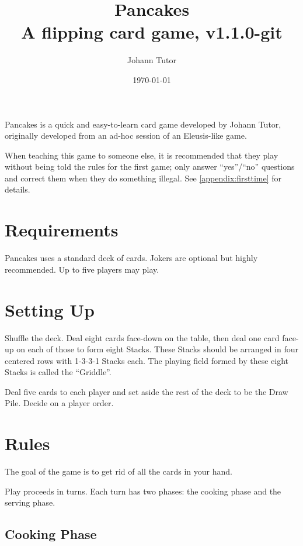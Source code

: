 \documentclass{article}
\newcommand\theversion{1.1.0-git}
\begin{document}
\title{Pancakes\\ \large A flipping card game, v\theversion}
\author{Johann Tutor}
\date{\today}
\maketitle

Pancakes is a quick and easy-to-learn card game developed by Johann Tutor, originally developed from an ad-hoc session of an Eleusis-like game.

When teaching this game to someone else, it is recommended that they play without being told the rules for the first game;
only answer ``yes''/``no'' questions and correct them when they do something illegal. See \autoref{appendix:firsttime} for details.

\tableofcontents

\newpage

\section{Requirements}
\label{sec:requirements}

Pancakes uses a standard deck of cards. Jokers are optional but highly recommended.
Up to five players may play.

\section{Setting Up}
\label{sec:setup}

Shuffle the deck. Deal eight cards face-down on the table, then deal one card face-up on each of those to form eight Stacks.
These Stacks should be arranged in four centered rows with 1-3-3-1 Stacks each.
The playing field formed by these eight Stacks is called the ``Griddle''.

Deal five cards to each player and set aside the rest of the deck to be the Draw Pile. Decide on a player order.

\section{Rules}
\label{sec:rules}

The goal of the game is to get rid of all the cards in your hand.

Play proceeds in turns. Each turn has two phases: the cooking phase and the serving phase.

\subsection{Cooking Phase}
\label{sec:cookingphase}
\end{document}

